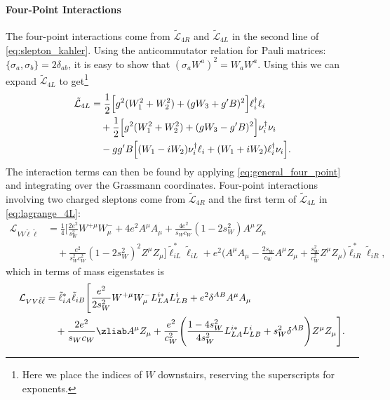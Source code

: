 \paragraph{Four-Point Interactions}
The four-point interactions come from $\tilde{\mathcal L}_{4R}$ and $\tilde{\mathcal L}_{4L}$ in the second line of \cref{eq:slepton_kahler}.
Using the anticommutator relation for Pauli matrices:
$\{\sigma_a,\sigma_b\} = 2 \delta_{ab}$,
it is easy to show that
$(\sigma_a W^a)^2 = W_aW^a$.
Using this we can expand $\tilde{\mathcal{L}}_{4L}$ to get\footnote{
    Here we place the indices of $W$ downstairs, reserving the superscripts for exponents.
}
\begin{equation}
    \begin{split}
        \tilde{\mathcal{L}}_{4L} &=
        \frac{1}{2} \Bigl[
            g^2 (W_1^2+W_2^2) + (gW_3+g'B)^2
        \Bigr] \ell_i^\dagger \ell_i
        \\ &\quad
        + \frac{1}{2} \Bigl[
            g^2 (W_1^2+W_2^2) + (gW_3 - g'B)^2
        \Bigr] \nu_i^\dagger \nu_i
        \\ &\quad
        -gg'B \Bigl[
            (W_1-iW_2)\nu_i^\dagger\ell_i + (W_1+iW_2)\ell_i^\dagger\nu_i
        \Bigr].
        \label{eq:lagrange_4L}
    \end{split}
\end{equation}
The interaction terms can then be found by applying \cref{eq:general_four_point} and integrating over the Grassmann coordinates.
Four-point interactions involving two charged sleptons come from $\tilde{\mathcal{L}}_{4R}$ and the first term of $\tilde{\mathcal{L}}_{4L}$ in \cref{eq:lagrange_4L}:
\begin{align*}
    \mathcal{L}_{VV\tilde\ell\tilde\ell}
    &= \frac{1}{4} \Biggl[
        \frac{2e^2}{s_W^2} W^{+\mu}W^-_\mu + 4e^2 A^\mu A_\mu
        + \frac{4e^2}{s_Wc_W}(1-2s_W^2) A^\mu Z_\mu
        \\ &\quad
        + \frac{e^2}{s_W^2c_W^2}(1 - 2s_W^2)^2 Z^\mu Z_\mu
    \Biggr] \tilde\ell_{iL}^*\tilde\ell_{iL}
    + e^2 \biggl( A^\mu A_\mu - \frac{2s_W}{c_W} A^\mu Z_\mu + \frac{s_W^2}{c_W^2} Z^\mu Z_\mu \biggr)
    \tilde\ell_{iR}^*\tilde\ell_{iR},
\end{align*}
which in terms of mass eigenstates is
\begin{equation}
    \begin{split}
        \mathcal{L}_{VV\tilde\ell\tilde\ell}
        &= \tilde\ell_{iA}^*\tilde\ell_{iB} \Biggl[
            \frac{e^2}{2s_W^2} W^{+\mu}W^-_\mu L^{i*}_{LA}L^i_{LB}
            + e^2 \delta^{AB} A^\mu A_\mu
            \\ & \quad
            + \frac{2e^2}{s_Wc_W} \zliab A^\mu Z_\mu
            + \frac{e^2}{c_W^2} \Biggl(
                \frac{1-4s_W^2}{4s_W^2} L_{LA}^{i*}L_{LB}^i + s_W^2 \delta^{AB}
            \Biggr) Z^\mu Z_\mu
        \Biggr].
    \end{split}
    \label{eq:L_VVll}
\end{equation}
